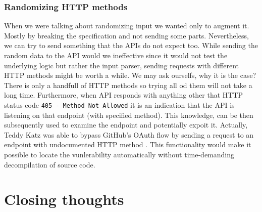 \subsubsection{Randomizing HTTP methods}
When we were talking about randomizing input we wanted only to augment it. Mostly by breaking the specification and not sending some parts. Nevertheless, we can try to send something that the APIs do not expect too. While sending the random data to the API would we ineffective since it would not test the underlying logic but rather the input parser, sending requests with different HTTP methods might be worth a while. We may ask ourselfs, why it is the case? There is only a handfull of HTTP methods so trying all od them will not take a long time. Furthermore, when API responds with anything other that HTTP status code \texttt{405 - Method Not Allowed} it is an indication that the API is listening on that endpoint (with specified method). This knowledge, can be then subsequently used to examine the endpoint and potentially expoit it. Actually, Teddy Katz was able to bypass GitHub's OAuth flow by sending a request to an endpoint with undocumented HTTP method \cite{kartz2019bypass}. This functionality would make it possible to locate the vunlerability automatically without time-demanding decompilation of source code.


\section{Closing thoughts}
